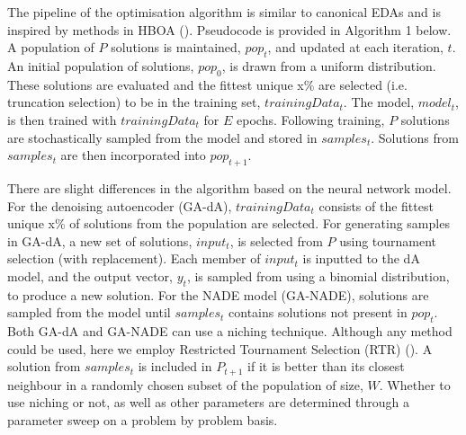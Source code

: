 \documentclass[twoside]{article}
\begin{document}
The pipeline of the optimisation algorithm is similar to canonical EDAs and is inspired by methods in HBOA (\cite{hboa}). Pseudocode is provided in Algorithm 1 below. A population of \(P\) solutions is maintained, \(pop_t\), and updated at each iteration, \(t\). An initial population of solutions, \(pop_0\), is drawn from a uniform distribution. These solutions are evaluated and the fittest unique x\% are selected (i.e. truncation selection) to be in the training set, \(trainingData_t\). The model, \(model_t\), is then trained with \(trainingData_t\) for \(E\) epochs. Following training, \(P\) solutions are stochastically sampled from the model and stored in \(samples_t\). Solutions from \(samples_t\) are then incorporated into \(pop_{t+1}\).

There are slight differences in the algorithm based on the neural network model. For the denoising autoencoder (GA-dA), \(trainingData_t\) consists of the fittest unique x\% of solutions from the population are selected. For generating samples in GA-dA, a new set of solutions, \(input_t\), is selected from \(P\) using tournament selection (with replacement). Each member of \(input_t\) is inputted to the dA model, and the output vector, \(y_t\), is sampled from using a binomial distribution, to produce a new solution. For the NADE model (GA-NADE), solutions are sampled from the model until \(samples_t\) contains solutions not present in \(pop_t\). Both GA-dA and GA-NADE can use a niching technique. Although any method could be used, here we employ Restricted Tournament Selection (RTR) (\cite{hboa}). A solution from \(samples_t\) is included in \(P_{t+1}\) if it is better than its closest neighbour in a randomly chosen subset of the population of size, \(W\). Whether to use niching or not, as well as other parameters are determined through a parameter sweep on a problem by problem basis.
 
\end{document}
